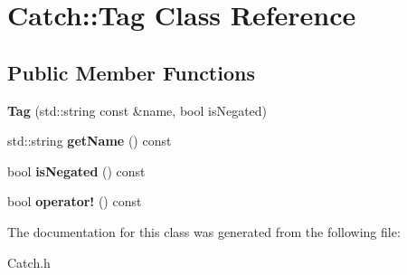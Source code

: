 \hypertarget{class_catch_1_1_tag}{\section{Catch\-:\-:Tag Class Reference}
\label{class_catch_1_1_tag}
}
\subsection*{Public Member Functions}
\begin{DoxyCompactItemize}
\item 
\hypertarget{class_catch_1_1_tag_a3d43477e0f15d4baddc6f6d0943294ae}{{\bfseries Tag} (std\-::string const \&name, bool is\-Negated)}\label{class_catch_1_1_tag_a3d43477e0f15d4baddc6f6d0943294ae}

\item 
\hypertarget{class_catch_1_1_tag_a4fabe27cb327c3221cf9f93573aaae96}{std\-::string {\bfseries get\-Name} () const }\label{class_catch_1_1_tag_a4fabe27cb327c3221cf9f93573aaae96}

\item 
\hypertarget{class_catch_1_1_tag_a437011d6ba5afc54c0e6649b7a200f26}{bool {\bfseries is\-Negated} () const }\label{class_catch_1_1_tag_a437011d6ba5afc54c0e6649b7a200f26}

\item 
\hypertarget{class_catch_1_1_tag_aebcc5d6af02cbfdb27c6e9a0718787fa}{bool {\bfseries operator!} () const }\label{class_catch_1_1_tag_aebcc5d6af02cbfdb27c6e9a0718787fa}

\end{DoxyCompactItemize}


The documentation for this class was generated from the following file\-:\begin{DoxyCompactItemize}
\item 
Catch.\-h\end{DoxyCompactItemize}
